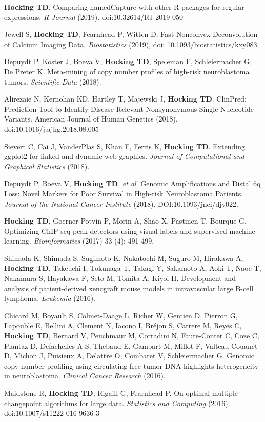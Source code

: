\documentclass[margin,line]{res}
\begin{document}
\begin{resume}
{\bf Hocking TD}. Comparing namedCapture with other R packages for
regular expressions. {\it R Journal} (2019). doi:10.32614/RJ-2019-050

Jewell S, {\bf Hocking TD}, Fearnhead P, Witten D. Fast Nonconvex
Deconvolution of Calcium Imaging Data. {\it Biostatistics} (2019), doi:
10.1093/biostatistics/kxy083.

Depuydt P, Koster J, Boeva V, {\bf Hocking TD}, Speleman F,
Schleiermacher G, De Preter K. Meta-mining of copy number profiles of
high-risk neuroblastoma tumors. {\it Scientific Data} (2018).

Alirezaie N, Kernohan KD, Hartley T, Majewski J, {\bf Hocking
  TD}. ClinPred: Prediction Tool to Identify Disease-Relevant
Nonsynonymous Single-Nucleotide Variants. American Journal of Human
Genetics (2018). doi:10.1016/j.ajhg.2018.08.005

Sievert C, Cai J, VanderPlas S, Khan F, Ferris K, {\bf Hocking
  TD}. Extending ggplot2 for linked and dynamic web graphics. {\it
  Journal of Computational and Graphical Statistics} (2018).

Depuydt P, Boeva V, {\bf Hocking TD}, {\it et al}. Genomic
Amplifications and Distal 6q Loss: Novel Markers for Poor Survival in
High-risk Neuroblastoma Patients. {\it Journal of the National Cancer
  Institute} (2018). DOI:10.1093/jnci/djy022.

{\bf Hocking TD}, Goerner-Potvin P, Morin A, Shao X, Pastinen T,
Bourque G. Optimizing ChIP-seq peak detectors using visual labels and
supervised machine learning. {\it Bioinformatics} (2017) 33 (4): 491-499.

Shimada K, Shimada S, Sugimoto K, Nakatochi M, Suguro M, Hirakawa A,
{\bf Hocking TD}, Takeuchi I, Tokunaga T, Takagi Y, Sakamoto A, Aoki T, Naoe
T, Nakamura S, Hayakawa F, Seto M, Tomita A, Kiyoi H. Development and
analysis of patient-derived xenograft mouse models in intravascular
large B-cell lymphoma. {\it Leukemia} (2016).

Chicard M, Boyault S, Colmet-Daage L, Richer W, Gentien D, Pierron G,
Lapouble E, Bellini A, Clement N, Iacono I, Bréjon S, Carrere M, Reyes
C, {\bf Hocking TD}, Bernard V, Peuchmaur M, Corradini N, Faure-Conter
C, Coze C, Plantaz D, Defachelles A-S, Thebaud E, Gambart M, Millot F,
Valteau-Couanet D, Michon J, Puisieux A, Delattre O, Combaret V,
Schleiermacher G. Genomic copy number profiling using circulating free
tumor DNA highlights heterogeneity in neuroblastoma. {\it Clinical Cancer
Research} (2016).

Maidstone R, {\bf Hocking TD}, Rigaill G, Fearnhead P. On optimal
multiple changepoint algorithms for large data. {\it Statistics and
Computing} (2016). doi:10.1007/s11222-016-9636-3 


\end{resume}
\end{document}
